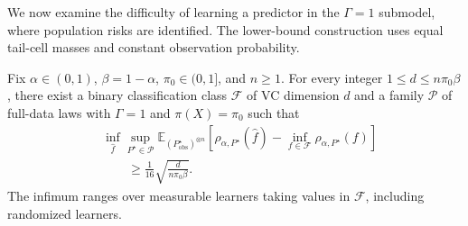 We now examine the difficulty of learning a predictor in the \(\Gamma=1\) submodel, where population risks are identified. The lower-bound construction uses equal tail-cell masses and constant observation probability.

\begin{theorem}
\label{thm:main:lower-bound}
Fix $\alpha\in(0,1)$, $\beta=1-\alpha$, $\pi_0\in(0,1]$, and $n\geq1$.
For every integer $1\leq d\leq n\pi_0\beta$, there exist a binary
classification class $\mathcal F$ of VC dimension $d$ and a family
$\mathcal P$ of full-data laws with $\Gamma=1$ and $\pi(X)=\pi_0$ such that
\begin{equation}
 \begin{aligned}
 &\inf_{\widehat f}\sup_{P^\star\in\mathcal P}
 \mathbb E_{(P^\star_{\mathrm{obs}})^{\otimes n}}
 \left[\rho_{\alpha,P^\star}(\widehat f)
       -\inf_{f\in\mathcal F}\rho_{\alpha,P^\star}(f)\right]\\
 &\qquad\geq\frac1{16}\sqrt{\frac{d}{n\pi_0\beta}}.
 \end{aligned}
 \label{eq:b:learning-lower-bound}
\end{equation}
The infimum ranges over measurable learners taking values in $\mathcal F$,
including randomized learners.
\end{theorem}


